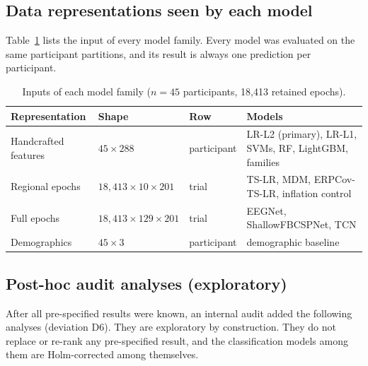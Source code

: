 \subsection{Data representations seen by each model}
Table~\ref{tab:views} lists the input of every model family. Every model was evaluated on the same participant
partitions, and its result is always one prediction per participant.

\begin{table}[h]
\centering\scriptsize
\caption{Inputs of each model family ($n=45$ participants, 18{,}413 retained epochs).}
\label{tab:views}
\begin{tabular}{@{}lllp{5.6cm}@{}}
\toprule
Representation & Shape & Row & Models \\
\midrule
Handcrafted features & $45\times288$ & participant & LR-L2 (primary), LR-L1, SVMs, RF, LightGBM, families \\
Regional epochs & $18{,}413\times10\times201$ & trial & TS-LR, MDM, ERPCov-TS-LR, inflation control \\
Full epochs & $18{,}413\times129\times201$ & trial & EEGNet, ShallowFBCSPNet, TCN \\
Demographics & $45\times3$ & participant & demographic baseline \\
\bottomrule
\end{tabular}
\end{table}

\subsection{Post-hoc audit analyses (exploratory)}\label{sec:audit-methods}
After all pre-specified results were known, an internal audit added the following analyses (deviation D6). They are
exploratory by construction. They do not replace or re-rank any pre-specified result, and the classification models
among them are Holm-corrected among themselves.

